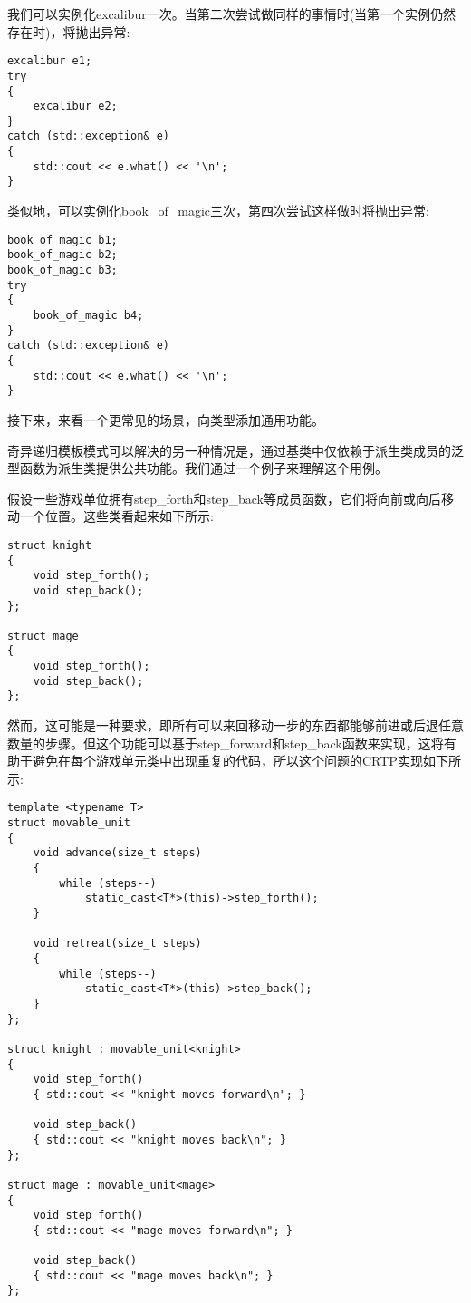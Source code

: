 我们可以实例化excalibur一次。当第二次尝试做同样的事情时(当第一个实例仍然存在时)，将抛出异常:

\begin{lstlisting}[style=styleCXX]
excalibur e1;
try
{
	excalibur e2;
}
catch (std::exception& e)
{
	std::cout << e.what() << '\n';
}
\end{lstlisting}

类似地，可以实例化book\_of\_magic三次，第四次尝试这样做时将抛出异常:

\begin{lstlisting}[style=styleCXX]
book_of_magic b1;
book_of_magic b2;
book_of_magic b3;
try
{
	book_of_magic b4;
}
catch (std::exception& e)
{
	std::cout << e.what() << '\n';
}
\end{lstlisting}

接下来，来看一个更常见的场景，向类型添加通用功能。


奇异递归模板模式可以解决的另一种情况是，通过基类中仅依赖于派生类成员的泛型函数为派生类提供公共功能。我们通过一个例子来理解这个用例。

假设一些游戏单位拥有step\_forth和step\_back等成员函数，它们将向前或向后移动一个位置。这些类看起来如下所示:

\begin{lstlisting}[style=styleCXX]
struct knight
{
	void step_forth();
	void step_back();
};

struct mage
{
	void step_forth();
	void step_back();
};
\end{lstlisting}

然而，这可能是一种要求，即所有可以来回移动一步的东西都能够前进或后退任意数量的步骤。但这个功能可以基于step\_forward和step\_back函数来实现，这将有助于避免在每个游戏单元类中出现重复的代码，所以这个问题的CRTP实现如下所示:

\begin{lstlisting}[style=styleCXX]
template <typename T>
struct movable_unit
{
	void advance(size_t steps)
	{
		while (steps--)
			static_cast<T*>(this)->step_forth();
	}

	void retreat(size_t steps)
	{
		while (steps--)
			static_cast<T*>(this)->step_back();
	}
};

struct knight : movable_unit<knight>
{
	void step_forth()
	{ std::cout << "knight moves forward\n"; }

	void step_back()
	{ std::cout << "knight moves back\n"; }
};

struct mage : movable_unit<mage>
{
	void step_forth()
	{ std::cout << "mage moves forward\n"; }

	void step_back()
	{ std::cout << "mage moves back\n"; }
};
\end{lstlisting}

